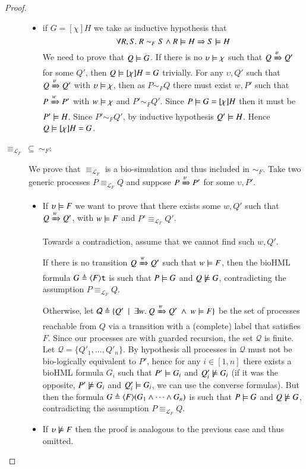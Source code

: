 \begin{proof}
\begin{description}
\begin{itemize}
\item
if $G=[\chi] H$ we take as inductive hypothesis that
$$
\forall R,S.\ R \sim_F S \wedge R\models H \Rightarrow S \models H
$$
We need to prove that $Q\models G$.
If there is no $\upsilon\models \chi$ such that $Q\xRightarrow{\upsilon}Q'$ for some $Q'$, then 
 $Q\models [\chi] H=G$ trivially.
For any $\upsilon,Q'$ such that $Q\xRightarrow{\upsilon}Q'$ with $\upsilon\models \chi$, then as $P\sim_F Q$ there must exist $w,P'$ such that $P\xRightarrow{w}P'$ with $w\models \chi$ and $P'\sim_F Q'$. Since $P\models G=[\chi] H$ then it must be $P'\models H$. Since $P'\sim_F Q'$, by inductive hypothesis $Q'\models H$. Hence $Q\models [\chi] H = G$.
\end{itemize}

\item[$\equiv_{\mathcal{L}_F}\ \subseteq\ \sim_F$:]
We prove that $\equiv_{\mathcal{L}_F}$ is a bio-simulation and thus included in $\sim_F$.
Take two generic processes $P\equiv_{\mathcal{L}_F} Q$ and suppose $P\xRightarrow{\upsilon}P'$ for some $\upsilon,P'$. 
\begin{itemize}
\item
If $\upsilon \models F$ we want to prove that there exists some $w,Q'$ such that $Q\xRightarrow{w}Q'$, with $w\models F$ and $P'\equiv_{\mathcal{L}_F} Q'$.

Towards a contradiction, assume that we cannot find such $w,Q'$.

If there is no transition $Q\xRightarrow{w}Q'$ such that $w\models F$, then the bioHML formula $G \triangleq \langle F\rangle{\tt t}$ is such that $P\models G$ and $Q\not\models G$, contradicting the assumption $P\equiv_{\mathcal{L}_F} Q$.

Otherwise, let $\mathcal{Q}\triangleq \{Q'~\mid~\exists w.\ Q\xRightarrow{w}Q' \ \wedge\ w\models F\}$ be the set of processes reachable from $Q$ via a transition with a (complete) label that satisfies $F$. Since our processes are with guarded recursion, the set $\mathcal{Q}$ is finite. Let $\mathcal{Q} = \{Q'_1,...,Q'_n\}$. By hypothesis all processes in $\mathcal{Q}$ must not be bio-logically equivalent to $P'$, hence for any $i\in[1,n]$ there exists a bioHML formula $G_i$ such that $P'\models G_i$ and $Q'_i\not\models G_i$ (if it was the opposite, $P'\not\models G_i$ and $Q'_i\models G_i$, we can use the converse formulas). But then the formula $G\triangleq \langle F\rangle(G_1\wedge\dots\wedge G_n)$ is such that $P\models G$ and $Q\not\models G$, contradicting the assumption $P\equiv_{\mathcal{L}_F} Q$.

\item
If $\upsilon \not\models F$ then the proof is analogous to the previous case and thus omitted.
\end{itemize}
\end{description}
\end{proof}
